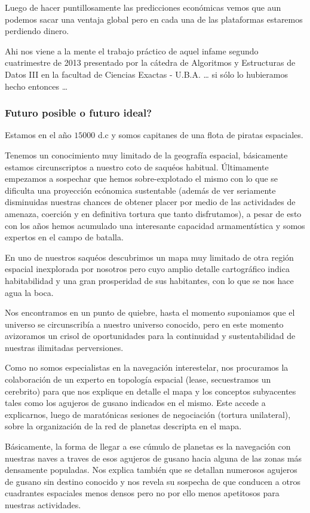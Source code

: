 Luego de hacer puntillosamente las predicciones econ\'omicas
vemos que aun podemos sacar una ventaja global pero en cada
una de las plataformas estaremos perdiendo dinero.

Ahi nos viene a la mente el trabajo pr\'actico de 
aquel infame segundo cuatrimestre de 2013 presentado por 
la c\'atedra de Algoritmos y Estructuras de Datos III 
en la facultad de Ciencias Exactas - U.B.A. \ldots
si s\'olo lo hubieramos hecho entonces \ldots


\subsubsection{Futuro posible o futuro ideal?}
Estamos en el a\~no $15000$ d.c y somos capitanes de una flota
de piratas espaciales. 

Tenemos un conocimiento muy limitado
de la geograf\'ia espacial, b\'asicamente estamos circunscriptos
a nuestro coto de saqu\'eos habitual. \'Ultimamente
empezamos a sospechar que hemos sobre-explotado el mismo con
lo que se dificulta una proyecci\'on ec\'onomica sustentable
(adem\'as de ver seriamente disminuidas nuestras chances de
obtener placer por medio de las actividades de amenaza, coerci\'on
y en definitiva tortura que tanto disfrutamos), a pesar de esto
con los a\~nos hemos acumulado una interesante capacidad 
armament\'istica y somos expertos en el campo de batalla.

En uno de nuestros saqu\'eos descubrimos un mapa muy limitado
de otra regi\'on espacial inexplorada por nosotros pero cuyo 
amplio detalle cartogr\'afico indica habitabilidad y una
gran prosperidad de sus habitantes, con lo que se nos hace 
agua la boca.

Nos encontramos en un punto de quiebre, hasta el momento
suponiamos que el universo se circunscrib\'ia a nuestro 
universo conocido, pero en este momento avizoramos un 
crisol de oportunidades para la continuidad y sustentabilidad
de nuestras ilimitadas perversiones.

Como no somos especialistas en la navegaci\'on interestelar, nos
procuramos la colaboraci\'on de un experto en topolog\'ia espacial
(lease, secuestramos un cerebrito) para que nos explique en 
detalle el mapa y los conceptos subyacentes tales como los 
agujeros de gusano indicados en el mismo. Este accede a explicarnos, 
luego de marat\'onicas sesiones de negociaci\'on (tortura unilateral), 
sobre la organizaci\'on de la red de planetas descripta en el mapa.

B\'asicamente, la forma de llegar a ese c\'umulo de planetas es
la navegaci\'on con nuestras naves a traves de esos agujeros de
gusano hacia alguna de las zonas m\'as densamente populadas. Nos
explica tambi\'en que se detallan numerosos agujeros de gusano
sin destino conocido y nos revela su sospecha de que conducen 
a otros cuadrantes espaciales menos densos pero no por ello
menos apetitosos para nuestras actividades. 

